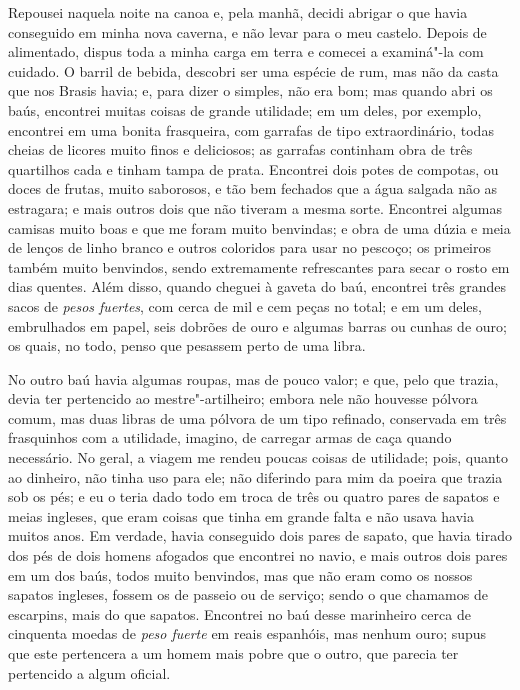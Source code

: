 Repousei naquela noite na canoa e, pela manhã, decidi abrigar o que
havia conseguido em minha nova caverna, e não levar para o meu castelo.
Depois de alimentado, dispus toda a minha carga em terra e comecei a
examiná"-la com cuidado. O barril de bebida, descobri ser uma espécie de
rum, mas não da casta que nos Brasis havia; e, para dizer o simples, não
era bom; mas quando abri os baús, encontrei muitas coisas de grande
utilidade; em um deles, por exemplo, encontrei em uma bonita frasqueira,
com garrafas de tipo extraordinário, todas cheias de licores muito finos
e deliciosos; as garrafas continham obra de três quartilhos cada e
tinham tampa de prata. Encontrei dois potes de compotas, ou doces de
frutas, muito saborosos, e tão bem fechados que a água salgada não as
estragara; e mais outros dois que não tiveram a mesma sorte. Encontrei
algumas camisas muito boas e que me foram muito benvindas; e obra de uma
dúzia e meia de lenços de linho branco e outros coloridos para usar no
pescoço; os primeiros também muito benvindos, sendo extremamente
refrescantes para secar o rosto em dias quentes. Além disso, quando
cheguei à gaveta do baú, encontrei três grandes sacos de \emph{pesos
fuertes}, com cerca de mil e cem peças no total; e em um deles,
embrulhados em papel, seis dobrões de ouro e algumas barras ou cunhas de
ouro; os quais, no todo, penso que pesassem perto de uma libra.

No outro baú havia algumas roupas, mas de pouco valor; e que, pelo que
trazia, devia ter pertencido ao mestre"-artilheiro; embora nele não
houvesse pólvora comum, mas duas libras de uma pólvora de um tipo
refinado, conservada em três frasquinhos com a utilidade, imagino, de
carregar armas de caça quando necessário. No geral, a viagem me rendeu
poucas coisas de utilidade; pois, quanto ao dinheiro, não tinha uso para
ele; não diferindo para mim da poeira que trazia sob os pés; e eu o
teria dado todo em troca de três ou quatro pares de sapatos e meias
ingleses, que eram coisas que tinha em grande falta e não usava havia
muitos anos. Em verdade, havia conseguido dois pares de sapato, que
havia tirado dos pés de dois homens afogados que encontrei no navio, e
mais outros dois pares em um dos baús, todos muito benvindos, mas que
não eram como os nossos sapatos ingleses, fossem os de passeio ou de
serviço; sendo o que chamamos de escarpins, mais do que sapatos.
Encontrei no baú desse marinheiro cerca de cinquenta moedas de
\emph{peso fuerte} em reais espanhóis, mas nenhum ouro; supus que este
pertencera a um homem mais pobre que o outro, que parecia ter pertencido
a algum oficial.

